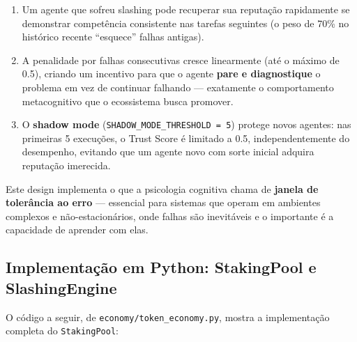 \begin{enumerate}
    \item Um agente que sofreu slashing pode recuperar sua reputação rapidamente se demonstrar competência consistente nas tarefas seguintes (o peso de 70\% no histórico recente ``esquece'' falhas antigas).
    
    \item A penalidade por falhas consecutivas cresce linearmente (até o máximo de 0.5), criando um incentivo para que o agente \textbf{pare e diagnostique} o problema em vez de continuar falhando --- exatamente o comportamento metacognitivo que o ecossistema busca promover.
    
    \item O \textbf{shadow mode} (\texttt{SHADOW\_MODE\_THRESHOLD = 5}) protege novos agentes: nas primeiras 5 execuções, o Trust Score é limitado a 0.5, independentemente do desempenho, evitando que um agente novo com sorte inicial adquira reputação imerecida.
\end{enumerate}

Este design implementa o que a psicologia cognitiva chama de \textbf{janela de tolerância ao erro} --- essencial para sistemas que operam em ambientes complexos e não-estacionários, onde falhas são inevitáveis e o importante é a capacidade de aprender com elas.

\subsection{Implementação em Python: StakingPool e SlashingEngine}

O código a seguir, de \texttt{economy/token\_economy.py}, mostra a implementação completa do \texttt{StakingPool}:


